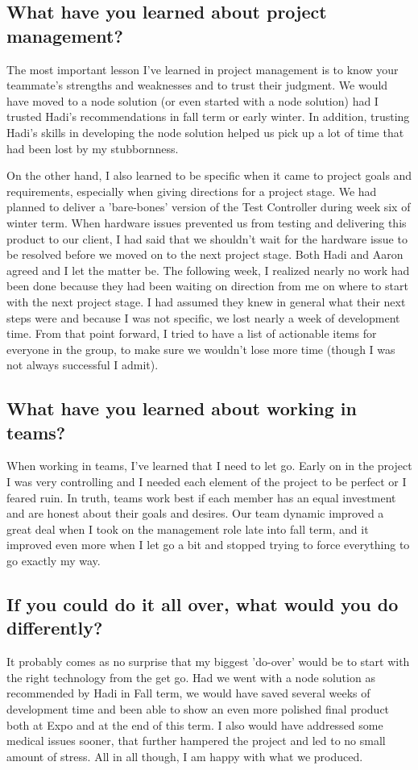 \documentclass[onecolumn, draftclsnofoot,10pt, compsoc]{report}
\begin{document}
\subsection{What have you learned about project management?}
The most important lesson I've learned in project management is to know your teammate's strengths and weaknesses and to trust their judgment. We would have moved to a node solution (or even started with a node solution) had I trusted Hadi's recommendations in fall term or early winter. In addition, trusting Hadi's skills in developing the node solution helped us pick up a lot of time that had been lost by my stubbornness.

On the other hand, I also learned to be specific when it came to project goals and requirements, especially when giving directions for a project stage. We had planned to deliver a 'bare-bones' version of the Test Controller during week six of winter term. When hardware issues prevented us from testing and delivering this product to our client, I had said that we shouldn't wait for the hardware issue to be resolved before we moved on to the next project stage. Both Hadi and Aaron agreed and I let the matter be. The following week, I realized nearly no work had been done because they had been waiting on direction from me on where to start with the next project stage. I had assumed they knew in general what their next steps were and because I was not specific, we lost nearly a week of development time. From that point forward, I tried to have a list of actionable items for everyone in the group, to make sure we wouldn't lose more time (though I was not always successful I admit). 
\subsection{What have you learned about working in teams?}
When working in teams, I've learned that I need to let go. Early on in the project I was very controlling and I needed each element of the project to be perfect or I feared ruin. In truth, teams work best if each member has an equal investment and are honest about their goals and desires. Our team dynamic improved a great deal when I took on the management role late into fall term, and it improved even more when I let go a bit and stopped trying to force everything to go exactly my way. 
\subsection{If you could do it all over, what would you do differently?}
It probably comes as no surprise that my biggest 'do-over' would be to start with the right technology from the get go. Had we went with a node solution as recommended by Hadi in Fall term, we would have saved several weeks of development time and been able to show an even more polished final product both at Expo and at the end of this term. I also would have addressed some medical issues sooner, that further hampered the project and led to no small amount of stress. All in all though, I am happy with what we produced. 
\end{document}
